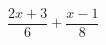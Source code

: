 \begin{ex}[type=expressions]
	\begin{condition}
		\( \dfrac{2x+3}{6} +\dfrac{x-1}{8}\)
	\end{condition}
\end{ex}